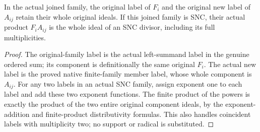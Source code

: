 \begin{lemma}
\label{lem:kn-nadel-auxiliary-branch-snc-labels}
\leanok
{}
In the actual joined family, the original label of $F_i$ and the original
new label of $A_{ij}$ retain their whole original ideals. If this joined
family is SNC, their actual product $F_i A_{ij}$ is the whole ideal of an
SNC divisor, including its full multiplicities.
\end{lemma}
\begin{proof}
The original-family label is the actual left-summand label in the genuine
ordered sum; its component is definitionally the same original $F_i$.
The actual new label is the proved native finite-family member label,
whose whole component is $A_{ij}$. For any two labels in an actual SNC
family, assign exponent one to each label and add these two exponent
functions. The finite product of the powers is exactly the product of
the two entire original component ideals, by the exponent-addition and
finite-product distributivity formulas. This also handles coincident
labels with multiplicity two; no support or radical is substituted.
\end{proof}

